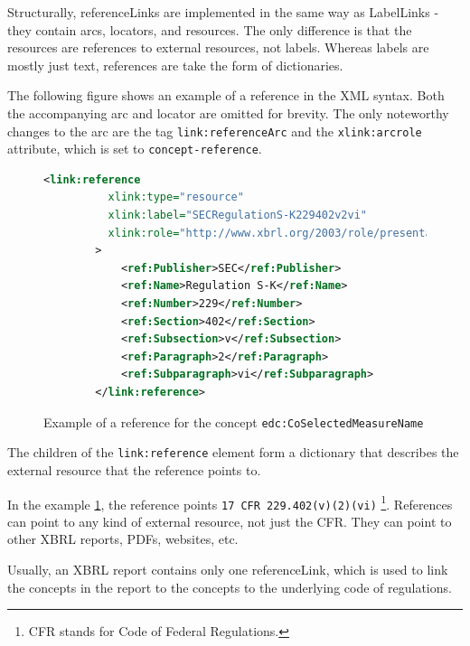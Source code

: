 Structurally, referenceLinks are implemented in the same way as LabelLinks - they contain arcs, locators, and resources.
The only difference is that the resources are references to external resources, not labels.
Whereas labels are mostly just text, references are take the form of dictionaries.

The following figure shows an example of a reference in the XML syntax.
Both the accompanying arc and locator are omitted for brevity.
The only noteworthy changes to the arc are the tag \texttt{link:referenceArc} and the \texttt{xlink:arcrole} attribute, which is set to \texttt{concept-reference}.

\begin{figure}[H]
    \begin{lstlisting}[language=XML]
        <link:reference 
          xlink:type="resource" 
          xlink:label="SECRegulationS-K229402v2vi" 
          xlink:role="http://www.xbrl.org/2003/role/presentationRef"
        >
            <ref:Publisher>SEC</ref:Publisher>
            <ref:Name>Regulation S-K</ref:Name>
            <ref:Number>229</ref:Number>
            <ref:Section>402</ref:Section>
            <ref:Subsection>v</ref:Subsection>
            <ref:Paragraph>2</ref:Paragraph>
            <ref:Subparagraph>vi</ref:Subparagraph>
        </link:reference>
    \end{lstlisting}
    \caption{Example of a reference for the concept \texttt{edc:CoSelectedMeasureName}}
    \label{fig:example_reference_xml}
\end{figure}


The children of the \texttt{link:reference} element form a dictionary that describes the external resource that the reference points to.

In the example \ref{fig:example_reference_xml}, the reference points \texttt{17 CFR 229.402(v)(2)(vi)}
\cite{cfr_229_402_17}
\footnote{CFR stands for Code of Federal Regulations.}.
References can point to any kind of external resource, not just the CFR.
They can point to other XBRL reports, PDFs, websites, etc.

Usually, an XBRL report contains only one referenceLink, 
which is used to link the concepts in the report to the concepts to the underlying code of regulations.

